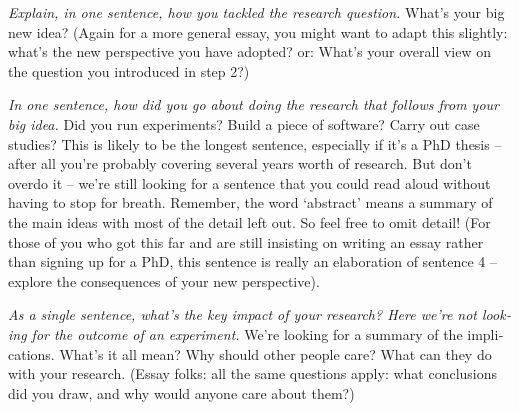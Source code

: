 \documentclass[
  numbers=autoendperiod,
  ngerman,  %
  a4paper,  %
  twoside,  %
  bibliography=totoc,
  headsepline,
  cleardoublepage=empty,
  parskip=half,
  draft=false
]{scrbook}
\theoremstyle{break}
\begin{document}
\begin{otherlanguage}{american}
  \emph{Explain, in one sentence, how you tackled the research question.}
  What’s your big new idea?
  (Again for a more general essay, you might want to adapt this slightly: what’s the new perspective you have adopted? or:
  What’s your overall view on the question you introduced in step 2?)

  \emph{In one sentence, how did you go about doing the research that follows from your big idea.}
  Did you run experiments?
  Build a piece of software?
  Carry out case studies?
  This is likely to be the longest sentence, especially if it’s a PhD thesis – after all you’re probably covering several years worth of research.
  But don’t overdo it – we’re still looking for a sentence that you could read aloud without having to stop for breath.
  Remember, the word ‘abstract’ means a summary of the main ideas with most of the detail left out.
  So feel free to omit detail!
  (For those of you who got this far and are still insisting on writing an essay rather than signing up for a PhD, this sentence is really an elaboration of sentence 4 – explore the consequences of your new perspective).

  \emph{As a single sentence, what’s the key impact of your research?
    Here we’re not looking for the outcome of an experiment.
  }
  We’re looking for a summary of the implications.
  What’s it all mean?
  Why should other people care?
  What can they do with your research.
  (Essay folks: all the same questions apply: what conclusions did you draw, and why would anyone care about them?)
\end{otherlanguage}


%
%
\tableofcontents

\listoffigures

\listoftables

\lstlistoflistings

\end{document}

